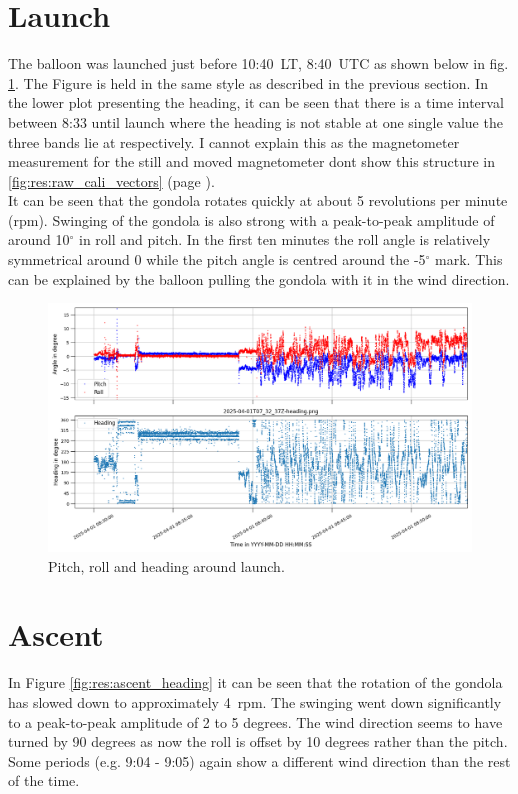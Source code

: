 \section{Launch \label{sec:launch}}
The balloon was launched just before 10:40~LT, 8:40~UTC as shown below in fig. \ref{fig:res:launch_heading}. The Figure is held in the same style as described in the previous section. In the lower plot presenting the heading, it can be seen that there is a time interval between 8:33 until launch where the heading is not stable at one single value the three bands lie at respectively. I cannot explain this as the magnetometer measurement for the still and moved magnetometer dont show this structure in \ref{fig:res:raw_cali_vectors} (page \pageref{fig:res:raw_cali_vectors}).\\
It can be seen that the gondola rotates quickly at about 5 revolutions per minute (rpm). Swinging of the gondola is also strong with a peak-to-peak amplitude of around 10$^\circ$ in roll and pitch. In the first ten minutes the roll angle is relatively symmetrical around 0 while the pitch angle is centred around the -5$^\circ$ mark. This can be explained by the balloon pulling the gondola with it in the wind direction.

\begin{figure}[H]
    \centering
    \includegraphics[width=\linewidth]{images/04_results/launch_heading.png}
    \caption[Heading at launch.]{Pitch, roll and heading around launch.}
    \label{fig:res:launch_heading}
\end{figure}


\section{Ascent \label{sec:ascent}}
In Figure \ref{fig:res:ascent_heading} it can be seen that the rotation of the gondola has slowed down to approximately 4~rpm. The swinging went down significantly to a peak-to-peak amplitude of 2 to 5 degrees. The wind direction seems to have turned by 90 degrees as now the roll is offset by 10 degrees rather than the pitch. Some periods (e.g. 9:04 - 9:05) again show a different wind direction than the rest of the time.

